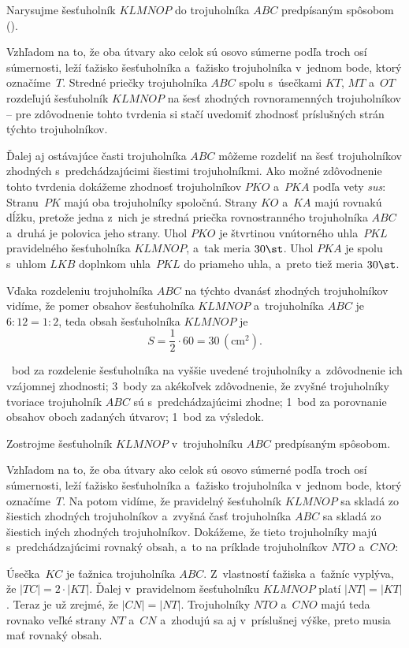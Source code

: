{%
Narysujme šesťuholník $KLMNOP$ do trojuholníka $ABC$ predpísaným spôsobom (\obr).
%

Vzhľadom na to, že oba útvary ako celok sú osovo súmerne podľa troch osí
súmernosti, leží ťažisko šesťuholníka a~ťažisko trojuholníka v~jednom
bode, ktorý označíme~$T$.
Stredné priečky trojuholníka $ABC$ spolu s~úsečkami $KT$, $MT$ a~$OT$ rozdeľujú
šesťuholník $KLMNOP$ na šesť zhodných rovnoramenných trojuholníkov
-- pre zdôvodnenie tohto tvrdenia si stačí uvedomiť zhodnosť príslušných
strán týchto trojuholníkov.

Ďalej aj ostávajúce časti trojuholníka $ABC$ môžeme rozdeliť na šesť
trojuholníkov zhodných s~predchádzajúcimi šiestimi trojuholníkmi.
Ako možné zdôvodnenie tohto tvrdenia dokážeme zhodnosť trojuholníkov $PKO$
a~$PKA$ podľa vety {\it sus\/}:
Stranu~$PK$ majú oba trojuholníky spoločnú.
Strany $KO$ a~$KA$ majú rovnakú dĺžku, pretože jedna z~nich je stredná priečka
rovnostranného trojuholníka $ABC$ a~druhá je polovica jeho strany. Uhol $PKO$ je
štvrtinou vnútorného uhla~$PKL$ pravidelného šesťuholníka $KLMNOP$, a~tak
meria $30\st$. Uhol $PKA$ je spolu s~uhlom $LKB$ doplnkom uhla~$PKL$ do
priameho uhla, a~preto tiež meria $30\st$.

Vďaka rozdeleniu trojuholníka $ABC$ na týchto dvanásť zhodných trojuholníkov
vidíme, že pomer obsahov šesťuholníka $KLMNOP$ a~trojuholníka $ABC$ je
$6:12={1:2}$,
teda obsah šesťuholníka $KLMNOP$ je
$$
S= \frac12\cdot 60 = 30\,(\text{cm}^2).
$$

~bod za rozdelenie šesťuholníka na vyššie uvedené trojuholníky a~zdôvodnenie
ich vzájomnej zhodnosti;
3~body za akékoľvek zdôvodnenie, že zvyšné trojuholníky tvoriace trojuholník
$ABC$ sú s~predchádzajúcimi zhodne;
1~bod za porovnanie obsahov oboch zadaných útvarov;
1~bod za výsledok.
\endhodnotenie

\ineriesenie
Zostrojme šesťuholník $KLMNOP$ v~trojuholníku $ABC$ predpísaným spôsobom.
%

Vzhľadom na to, že oba útvary ako celok sú osovo súmerné podľa troch osí
súmernosti, leží ťažisko šesťuholníka a~ťažisko trojuholníka v~jednom
bode, ktorý označíme~$T$.
Na \obr{} potom vidíme, že pravidelný šesťuholník $KLMNOP$ sa skladá zo šiestich
zhodných trojuholníkov a~zvyšná časť trojuholníka $ABC$ sa skladá zo šiestich iných zhodných trojuholníkov.
Dokážeme, že tieto trojuholníky majú s~predchádzajúcimi rovnaký obsah, a~to na
príklade trojuholníkov $NTO$ a~$CNO$:

Úsečka~$KC$ je ťažnica trojuholníka $ABC$.
Z~vlastností ťažiska a~ťažníc vyplýva, že  $|TC|= 2\cdot|KT|$.
Ďalej v~pravidelnom šesťuholníku $KLMNOP$ platí $|NT|=|KT|$.
Teraz je už zrejmé, že $|CN|=|NT|$.
Trojuholníky $NTO$ a~$CNO$ majú teda rovnako veľké strany $NT$ a~$CN$
a~zhodujú sa aj v~príslušnej výške, preto musia mať rovnaký obsah.

}
